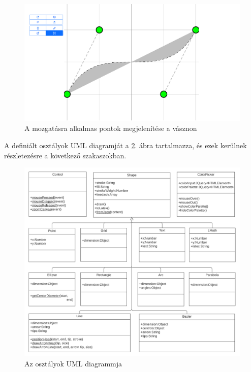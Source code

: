 \begin{figure}[!h]
	\centering
	\includegraphics[width=\textwidth]{images/editor_move.png}
	\caption{A mozgatásra alkalmas pontok megjelenítése a vásznon}
	\label{fig:move}
\end{figure}


A definiált osztályok UML diagramját a \ref{fig:uml}. ábra tartalmazza, és ezek kerülnek részletezésre a következő szakaszokban.

\begin{figure}[!h]
	\centering
	\includegraphics[width=\textwidth]{images/uml.png}
	\caption{Az osztályok UML diagrammja}
	\label{fig:uml}
\end{figure}

